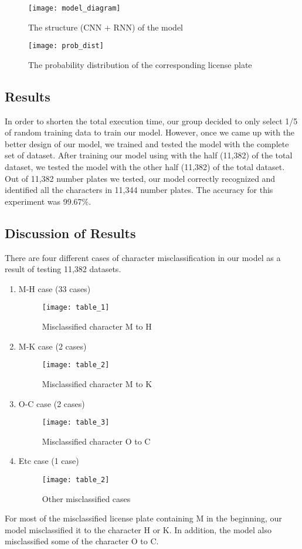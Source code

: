 \documentclass[conference]{IEEEtran}
\begin{document}
\begin{figure}[H]
\centering
\texttt{[image: model\_diagram]}
\caption{The structure (CNN + RNN) of the model}
\end{figure}

\begin{figure}[H]
\centering
\texttt{[image: prob\_dist]}
\caption{The probability distribution of the corresponding license plate}
\end{figure}

\subsection{Results}
In order to shorten the total execution time, our group decided to only select 1/5 of random training data to train our model. However, once we came up with the better design of our model, we trained and tested the model with the complete set of dataset.
After training our model using with the half (11,382) of the total dataset, we tested the model with the other half (11,382) of the total dataset. Out of 11,382 number plates we tested, our model correctly recognized and identified all the characters in 11,344 number plates. The accuracy for this experiment was 99.67\%.

\subsection{Discussion of Results}
There are four different cases of character misclassification in our model as a result of testing 11,382 datasets.
\begin{enumerate}
\item M-H case (33 cases)	\\
\begin{figure}[H]
\centering
\texttt{[image: table\_1]}
\caption{Misclassified character M to H}
\end{figure}

\item M-K case (2 cases)	\\
\begin{figure}[H]
\centering
\texttt{[image: table\_2]}
\caption{Misclassified character M to K}
\end{figure}

\item O-C case (2 cases)	\\
\begin{figure}[H]
\centering
\texttt{[image: table\_3]}
\caption{Misclassified character O to C}
\end{figure}

\item Etc case (1 case)\\
\begin{figure}[H]
\centering
\texttt{[image: table\_2]}
\caption{Other misclassified cases}
\end{figure}

\end{enumerate}
For most of the misclassified license plate containing M in the beginning, our model misclassified it to the character H or K. In addition, the model also misclassified some of the character O to C.
\end{document}
